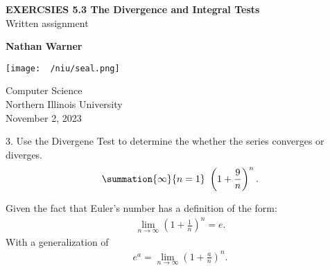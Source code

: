 \documentclass{report}
\title{\Huge{}}
\author{\huge{Nathan Warner}}
\date{\huge{}}
\begin{document}
        \begin{titlepage}
       \begin{center}
           \vspace*{1cm}
    
           \textbf{EXERCSIES 5.3 The Divergence and Integral Tests} \\
           Written assignment
    
           \vspace{0.5cm}
            
                
           \vspace{1.5cm}
    
           \textbf{Nathan Warner}
    
           \vfill
                
                
           \vspace{0.8cm}
         
           \texttt{[image: ~/niu/seal.png]}
                
           Computer Science \\
           Northern Illinois University\\
           November 2, 2023 \\
           
                
       \end{center}
    \end{titlepage}
    \tableofcontents
    \pagebreak 
    \begin{mdframed}
        3. Use the Divergene Test to determine the whether the series converges or diverges. 
        \begin{align*}
            \summation{\infty}{n=1}\ \left(1+\frac{9}{n}\right)^{n} 
        .\end{align*}
    \end{mdframed}
    \bigbreak \noindent 
    Given the fact that Euler's number has a definition of the form:
    \begin{align*}
        \lim\limits_{n \to \infty}{\left(1+\frac{1}{n}\right)^{n}} = e
    .\end{align*}
    \bigbreak \noindent 
   With a  generalization of 
   \begin{align*}
       e^{a} = \lim\limits_{n \to \infty}{\left(1+\frac{a}{n}\right)^{n}}
   .\end{align*}
\end{document}
